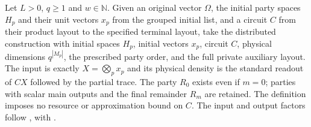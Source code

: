 \begin{definition}
    \label{def:chain_physical_construction}
    \leanok
    Let $L>0$, $q\ge1$ and $w\in\mathbb N$.
    Given an original vector $\Omega$, the initial
    party spaces $H_p$ and their unit vectors $x_p$ from the grouped
    initial list, and a circuit $C$ from their product layout to the
    specified terminal layout, take the distributed construction
    with initial spaces $H_p$, initial vectors $x_p$, circuit $C$,
    physical dimensions $q^{|M_p|}$, the prescribed party order, and
    the full private auxiliary layout.
    The input is exactly $X=\bigotimes_p x_p$ and its physical density
    is the standard readout of $CX$ followed by the partial trace.
    The party $R_0$ exists even if $m=0$; parties with scalar main
    outputs and the final remainder $R_m$ are retained.
    The definition imposes no resource or approximation bound on $C$.
    The input and output factors follow
    \cite[Part~II, the sweep proposition]{TNLean2026OneDimensional},
    with \cite{gap:tnlean_one_dimensional_band_sweep_corrections}.
\end{definition}

